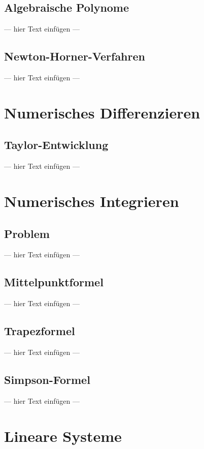 \documentclass[a4paper, 12pt]{article}
\begin{document}
\subsection{Algebraische Polynome}
--- hier Text einfügen ---


\subsection{Newton-Horner-Verfahren}
--- hier Text einfügen ---



\section{Numerisches Differenzieren}


\subsection{Taylor-Entwicklung}
--- hier Text einfügen ---



\section{Numerisches Integrieren}


\subsection{Problem}
--- hier Text einfügen ---


\subsection{Mittelpunktformel}
--- hier Text einfügen ---


\subsection{Trapezformel}
--- hier Text einfügen ---


\subsection{Simpson-Formel}
--- hier Text einfügen ---



\section{Lineare Systeme}
\end{document}

